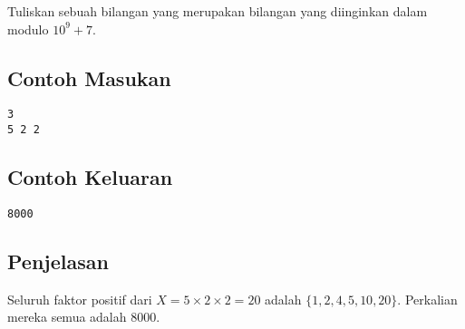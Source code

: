 \documentclass{article}
\begin{document}
Tuliskan sebuah bilangan yang merupakan bilangan yang diinginkan dalam modulo $10^9 + 7$.
\\

\begin{multicols}{2}
\subsection*{Contoh Masukan}
\begin{lstlisting}
3
5 2 2
\end{lstlisting}
\columnbreak
\subsection*{Contoh Keluaran}
\begin{lstlisting}
8000
\end{lstlisting}
\vfill
\null
\end{multicols}

\subsection*{Penjelasan}
Seluruh faktor positif dari $X = 5 \times 2 \times 2 = 20$ adalah $\{ 1,2,4,5,10,20 \}$. Perkalian mereka semua adalah $8000$.

\pagebreak
\end{document}
